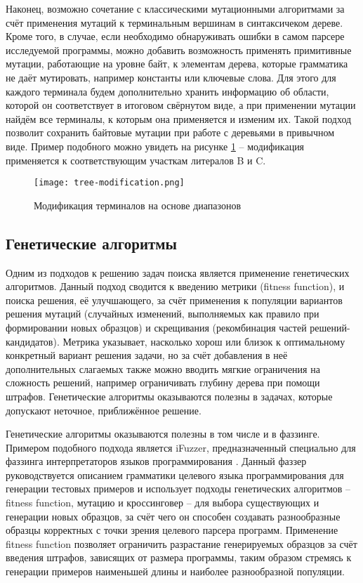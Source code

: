 Наконец, возможно сочетание с классическими мутационными алгоритмами за счёт применения мутаций к терминальным вершинам в синтаксичеком дереве. Кроме того, в случае, если необходимо обнаруживать ошибки в самом парсере исследуемой программы, можно добавить возможность применять примитивные мутации, работающие на уровне байт, к элементам дерева, которые грамматика не даёт мутировать, например константы или ключевые слова. Для этого для каждого терминала будем дополнительно хранить информацию об области, которой он соответствует в итоговом свёрнутом виде, а при применении мутации найдём все терминалы, к которым она применяется и изменим их. Такой подход позволит сохранить байтовые мутации при работе с деревьями в привычном виде. Пример подобного можно увидеть на рисунке \ref{fig:tree_modification} -- модификация применяется к соответствующим участкам литералов B и C.

\begin{figure}[h]
	\centering
	\texttt{[image: tree-modification.png]}
	\caption{Модификация терминалов на основе диапазонов}
	\label{fig:tree_modification}
\end{figure}%

\subsection{Генетические алгоритмы}

Одним из подходов к решению задач поиска является применение генетических алгоритмов. Данный подход сводится к введению метрики (fitness function), и поиска решения, её улучшающего, за счёт применения к популяции вариантов решения мутаций (случайных изменений, выполняемых как правило при формировании новых образцов) и скрещивания (рекомбинация частей решений-кандидатов). Метрика указывает, насколько хорош или близок к оптимальному конкретный вариант решения задачи, но за счёт добавления в неё дополнительных слагаемых также можно вводить мягкие ограничения на сложность решений, например ограничивать глубину дерева при помощи штрафов. Генетические алгоритмы оказываются полезны в задачах, которые допускают неточное, приближённое решение.

Генетические алгоритмы оказываются полезны в том числе и в фаззинге. Примером подобного подхода является iFuzzer, предназначенный специально для фаззинга интерпретаторов языков программирования \cite{ifuzzer}. Данный фаззер руководствуется описанием грамматики целевого языка программирования для генерации тестовых примеров и использует подходы генетических алгоритмов -- fitness function, мутацию и кроссинговер -- для выбора существующих и генерации новых образцов, за счёт чего он способен создавать разнообразные образцы корректных с точки зрения целевого парсера программ. Применение fitness function позволяет ограничить разрастание генерируемых образцов за счёт введения штрафов, зависящих от размера программы, таким образом стремясь к генерации примеров наименьшей длины и наиболее разнообразной популяции.

